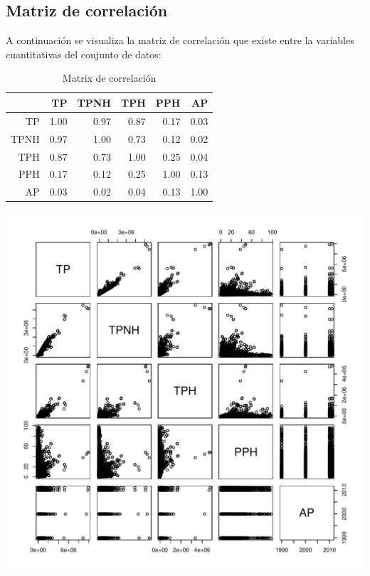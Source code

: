 \documentclass[conference]{IEEEtran}\usepackage[]{graphicx}\usepackage[]{color}
\makeatletter
\def\maxwidth{ %
  \ifdim\Gin@nat@width>\linewidth
    \linewidth
  \else
    \Gin@nat@width
  \fi
}
\makeatother
\begin{document}
\subsection{Matriz de correlación}
A continuación se visualiza la matriz de correlación que existe entre la variables cuantitativas del conjunto de datos: 
\begin{table}[ht]
\centering
\begin{tabular}{rrrrrr}
  \hline
 & TP & TPNH & TPH & PPH & AP \\ 
  \hline
TP & 1.00 & 0.97 & 0.87 & 0.17 & 0.03 \\ 
  TPNH & 0.97 & 1.00 & 0.73 & 0.12 & 0.02 \\ 
  TPH & 0.87 & 0.73 & 1.00 & 0.25 & 0.04 \\ 
  PPH & 0.17 & 0.12 & 0.25 & 1.00 & 0.13 \\ 
  AP & 0.03 & 0.02 & 0.04 & 0.13 & 1.00 \\ 
   \hline
\end{tabular}
\caption{Matrix de correlación} 
\end{table}

\includegraphics[width=\maxwidth]{figure/correlacion-1} 
\end{document}
